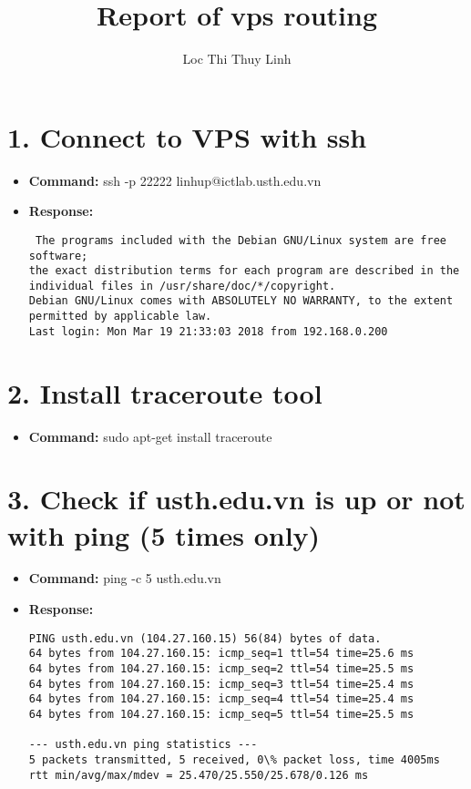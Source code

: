 \documentclass[11pt, oneside]{report}
\title{Report of vps routing}
\author{Loc Thi Thuy Linh}
\begin{document}
\maketitle

\section*{1. Connect to VPS with ssh}

\begin{itemize}
 \item \textbf{Command:} ssh -p 22222 linhup@ictlab.usth.edu.vn
 \item \textbf{Response:} 
 \begin{lstlisting}
 The programs included with the Debian GNU/Linux system are free software;
the exact distribution terms for each program are described in the
individual files in /usr/share/doc/*/copyright.
Debian GNU/Linux comes with ABSOLUTELY NO WARRANTY, to the extent
permitted by applicable law.
Last login: Mon Mar 19 21:33:03 2018 from 192.168.0.200
\end{lstlisting}
\end{itemize}

\section*{2. Install traceroute tool}
\begin{itemize}
\item \textbf{Command:} sudo apt-get install traceroute
\end{itemize}

\section*{3. Check if usth.edu.vn is up or not with ping (5 times only)}
\begin{itemize} 
\item \textbf{Command:} ping -c 5 usth.edu.vn
\item \textbf{Response:}
\begin{lstlisting}
PING usth.edu.vn (104.27.160.15) 56(84) bytes of data.
64 bytes from 104.27.160.15: icmp_seq=1 ttl=54 time=25.6 ms
64 bytes from 104.27.160.15: icmp_seq=2 ttl=54 time=25.5 ms
64 bytes from 104.27.160.15: icmp_seq=3 ttl=54 time=25.4 ms
64 bytes from 104.27.160.15: icmp_seq=4 ttl=54 time=25.4 ms
64 bytes from 104.27.160.15: icmp_seq=5 ttl=54 time=25.5 ms

--- usth.edu.vn ping statistics ---
5 packets transmitted, 5 received, 0\% packet loss, time 4005ms
rtt min/avg/max/mdev = 25.470/25.550/25.678/0.126 ms
\end{lstlisting}
\end{itemize}
\end{document}
